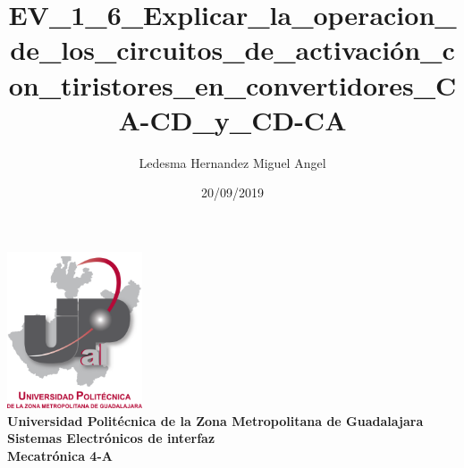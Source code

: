 \documentclass[letterpaper]{article}
\title{EV\_1\_6\_Explicar\_la\_operacion\_de\_los\_circuitos\_de\_activación\_con\_tiristores\_en\_convertidores\_CA-CD\_y\_CD-CA}
\author{Ledesma Hernandez Miguel Angel}
\date{20/09/2019}
\begin{document}
\maketitle
\vspace{9cm}
\begin{large}
\begin{center}
\includegraphics[width=4cm]{Imagenes/LOGO2.png}\\ \vspace{1.3cm}
\textbf{Universidad Politécnica de la Zona Metropolitana de Guadalajara}\\
\textbf{Sistemas Electrónicos de interfaz\\
Mecatrónica 4-A\\
}
\end{center}
\end{large}
\end{document}
